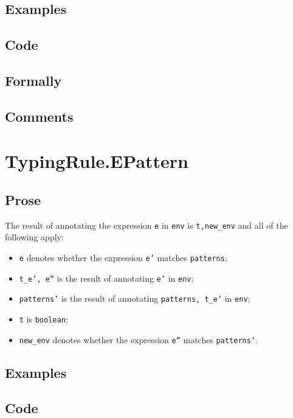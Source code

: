 \documentclass{book}
\begin{document}
  \subsection{Examples}

  \subsection{Code}

  \subsection{Formally}

  \subsection{Comments}

\section{TypingRule.EPattern \label{sec:TypingRule.EPattern}}

  \subsection{Prose}
  The result of annotating the expression \texttt{e} in \texttt{env} is
\texttt{t,new\_env} and all of the following apply:
  \begin{itemize}
  \item \texttt{e} denotes whether the expression \texttt{e'} matches \texttt{patterns};
  \item \texttt{t\_e', e''} is the result of annotating \texttt{e'} in \texttt{env};
  \item \texttt{patterns'} is the result of annotating \texttt{patterns, t\_e'} in \texttt{env};
  \item \texttt{t} is \texttt{boolean};
  \item \texttt{new\_env} denotes whether the expression \texttt{e''} matches \texttt{patterns'}.
  \end{itemize}

  \subsection{Examples}

  \subsection{Code}
        
\end{document}
